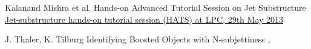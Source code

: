 {Kalanand Mishra et al.}
{Hands-on Advanced Tutorial Session on Jet Substructure}
{\href{https://twiki.cern.ch/twiki/pub/CMSPublic/SWGuideHATSJetSubstructure/JS_HATS_intro.pdf}{Jet-substructure hands-on tutorial session (HATS) at LPC, 29th May 2013}}

{J. Thaler, K. Tilburg}
{Identifying Boosted Objects with N-subjettiness}
{, }



